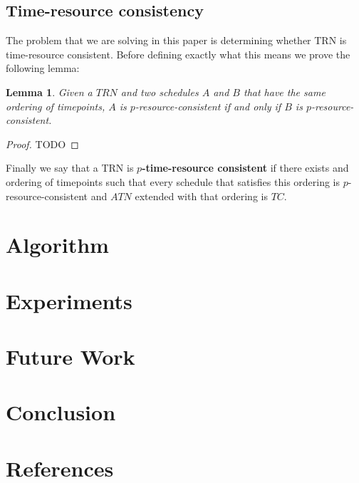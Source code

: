 \documentclass{article}
\newtheorem{lemma}[theorem]{Lemma}
\begin{document}
\begin{multicols}{2}
\subsection{Time-resource consistency}
The problem that we are solving in this paper is determining whether TRN is time-resource consistent. Before defining exactly what this means we prove the following lemma:
\begin{lemma}
Given a $TRN$ and two schedules $A$ and $B$ that have the same ordering of timepoints, $A$ is $p$-resource-consistent if and only if $B$ is $p$-resource-consistent.
\end{lemma}
\begin{proof}
TODO
\end{proof}

Finally we say that a TRN is \textbf{$p$-time-resource consistent} if there exists and ordering of timepoints such that every schedule that satisfies this ordering is $p$-resource-consistent and $ATN$ extended with that ordering is $TC$.

\section{Algorithm}

\section{Experiments}
\section{Future Work}
\section{Conclusion}
\section{References}


\end{multicols}
\end{document}
